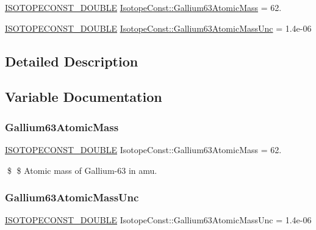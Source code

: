 \begin{DoxyCompactItemize}
\item 
\mbox{\hyperlink{group___isotope_const-_macros_ga8f45a7272ce02c0b4c65c44636ed719a}{I\+S\+O\+T\+O\+P\+E\+C\+O\+N\+S\+T\+\_\+\+D\+O\+U\+B\+LE}} \mbox{\hyperlink{group___isotope_const-_gallium-_ga63_ga11a56362bf8646fa642c30a323afa147}{Isotope\+Const\+::\+Gallium63\+Atomic\+Mass}} = 62.
\item 
\mbox{\hyperlink{group___isotope_const-_macros_ga8f45a7272ce02c0b4c65c44636ed719a}{I\+S\+O\+T\+O\+P\+E\+C\+O\+N\+S\+T\+\_\+\+D\+O\+U\+B\+LE}} \mbox{\hyperlink{group___isotope_const-_gallium-_ga63_ga81fe8af0c3439f2a5dea0117ba5d09ea}{Isotope\+Const\+::\+Gallium63\+Atomic\+Mass\+Unc}} = 1.\+4e-\/06
\end{DoxyCompactItemize}


\subsection{Detailed Description}


\subsection{Variable Documentation}
\mbox{\label{group___isotope_const-_gallium-_ga63_ga11a56362bf8646fa642c30a323afa147}} 
\subsubsection{\texorpdfstring{Gallium63\+Atomic\+Mass}{Gallium63AtomicMass}}
{\footnotesize\ttfamily \mbox{\hyperlink{group___isotope_const-_macros_ga8f45a7272ce02c0b4c65c44636ed719a}{I\+S\+O\+T\+O\+P\+E\+C\+O\+N\+S\+T\+\_\+\+D\+O\+U\+B\+LE}} Isotope\+Const\+::\+Gallium63\+Atomic\+Mass = 62.}

\$ \$ Atomic mass of Gallium-\/63 in amu. \mbox{\label{group___isotope_const-_gallium-_ga63_ga81fe8af0c3439f2a5dea0117ba5d09ea}} 
\subsubsection{\texorpdfstring{Gallium63\+Atomic\+Mass\+Unc}{Gallium63AtomicMassUnc}}
{\footnotesize\ttfamily \mbox{\hyperlink{group___isotope_const-_macros_ga8f45a7272ce02c0b4c65c44636ed719a}{I\+S\+O\+T\+O\+P\+E\+C\+O\+N\+S\+T\+\_\+\+D\+O\+U\+B\+LE}} Isotope\+Const\+::\+Gallium63\+Atomic\+Mass\+Unc = 1.\+4e-\/06}

